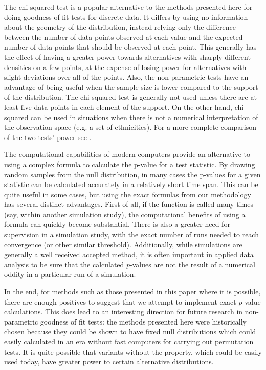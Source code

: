 The chi-squared test is a popular alternative to the methods presented here for doing goodness-of-fit tests for discrete data.
It differs by using no information about the geometry of the distribution, instead relying only the difference between the 
number of data points observed at each value and the expected number of data points that should be observed at each point. 
This generally has the effect of having a greater power towards alternatives with sharply different densities on a few points,
at the expense of losing power for alternatives with slight deviations over all of the points. Also, the non-parametric tests
have an advantage of being useful when the sample size is lower compared to the support of the distribution. The chi-squared
test is generally not used unless there are at least five data points in each element of the support. On the other hand,
chi-squared can be used in situations when there is not a numerical interpretation of the observation space 
(e.g. a set of ethnicities).
For a more complete comparison of the two tests' power see \cite{slakter65}.

The computational capabilities of modern computers provide an alternative to using a complex formula to
calculate the p-value for a test statistic. By drawing random samples from the null distribution, in many
cases the p-values for a given statistic can be calculated accurately in a relatively short time span.
This can be quite useful in some cases, but using the exact formulas from our methodology has several
distinct advantages. First of all, if the function is called many times (say, within another simulation
study), the computational benefits of using a formula can quickly become substantial. There is also a greater need
for supervision in a simulation study, with the exact number of runs needed to reach convergence (or other 
similar threshold). Additionally, while
simulations are generally a well received accepted method, it is often important in applied data analysis
to be sure that the calculated $p$-values are not the result of a numerical oddity in a particular
run of a simulation. 

In the end, for methods such as those presented in this paper where it is possible,
there are enough positives to suggest that we attempt to implement exact $p$-value calculations. This does lead
to an interesting direction for future research in non-parametric goodness of fit tests: the methods presented
here were historically chosen because they could be shown to have fixed null distributions which could easily
calculated in an era without fast computers for carrying out permutation tests. It is quite possible that
variants without the property, which could be easily used today, have greater power to certain alternative 
distributions.

